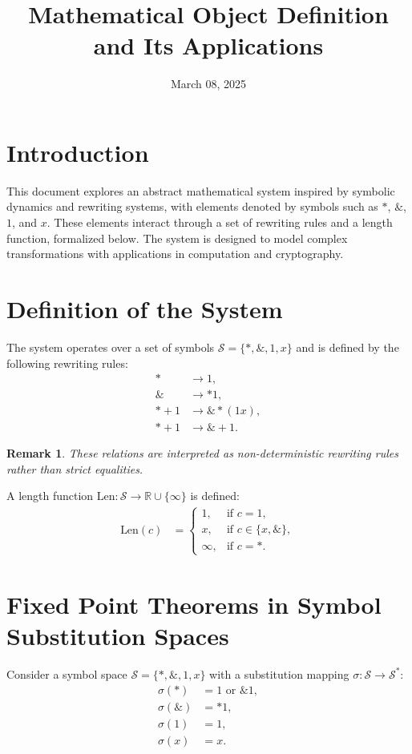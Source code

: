 \documentclass{article}
\newtheorem{remark}[theorem]{Remark}
\begin{document}
\title{Mathematical Object Definition and Its Applications}
\author{}
\date{March 08, 2025}
\maketitle

\section{Introduction}
This document explores an abstract mathematical system inspired by symbolic dynamics and rewriting systems, with elements denoted by symbols such as $*$, $\mathbin{\&}$, $1$, and $x$. These elements interact through a set of rewriting rules and a length function, formalized below. The system is designed to model complex transformations with applications in computation and cryptography.

\section{Definition of the System}
The system operates over a set of symbols $\mathcal{S} = \{*, \mathbin{\&}, 1, x\}$ and is defined by the following rewriting rules:
\begin{align*}
    * &\rightarrow 1, \\
    \mathbin{\&} &\rightarrow *1, \\
    * + 1 &\rightarrow \mathbin{\&}*(1x), \\
    * + 1 &\rightarrow \mathbin{\&} + 1.
\end{align*}

\begin{remark}
    These relations are interpreted as non-deterministic rewriting rules rather than strict equalities.
\end{remark}

A length function $\text{Len}: \mathcal{S} \to \mathbb{R} \cup \{\infty\}$ is defined:
\begin{align*}
    \text{Len}(c) &= \begin{cases} 
    1, & \text{if } c = 1, \\
    x, & \text{if } c \in \{x, \mathbin{\&}\}, \\
    \infty, & \text{if } c = *.
    \end{cases}
\end{align*}

\section{Fixed Point Theorems in Symbol Substitution Spaces}
Consider a symbol space $\mathcal{S} = \{*, \mathbin{\&}, 1, x\}$ with a substitution mapping $\sigma: \mathcal{S} \to \mathcal{S}^*$:
\begin{align*}
    \sigma(*) &= 1 \text{ or } \mathbin{\&}1, \\
    \sigma(\mathbin{\&}) &= *1, \\
    \sigma(1) &= 1, \\
    \sigma(x) &= x.
\end{align*}
\end{document}
